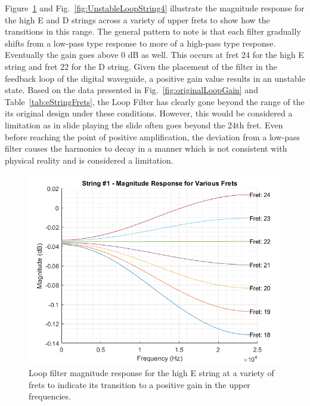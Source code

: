 \documentclass[../main.tex]{subfiles}
\begin{document}
Figure~\ref{fig:UnstableLoopString1} and Fig.~\ref{fig:UnstableLoopString4} illustrate the magnitude response for the high E and D strings across a variety of upper frets to show how the transitions in this range. The general pattern to note is that each filter gradually shifts from a low-pass type response to more of a high-pass type response. Eventually the gain goes above 0 dB as well. This occurs at fret 24 for the high E string and fret 22 for the D string. Given the placement of the filter in the feedback loop of the digital waveguide, a positive gain value results in an unstable state. Based on the data presented in Fig.~\ref{fig:originalLoopGain} and Table~\ref{tab:eStringFrets}, the Loop Filter has clearly gone beyond the range of the its original design under these conditions. However, this would be considered a limitation as in slide playing the slide often goes beyond the 24th fret. Even before reaching the point of positive amplification, the deviation from a low-pass filter causes the harmonics to decay in a manner which is not consistent with physical reality and is considered a limitation. 

\begin{figure}[h]
    \centering
    \includegraphics[scale=.47]{./images/plots/Unstable Loop Filter - String 1.png}
    \caption{Loop filter magnitude response for the high E string at a variety of frets to indicate its transition to a positive gain in the upper frequencies.}
    \label{fig:UnstableLoopString1}
\end{figure}
\end{document}
